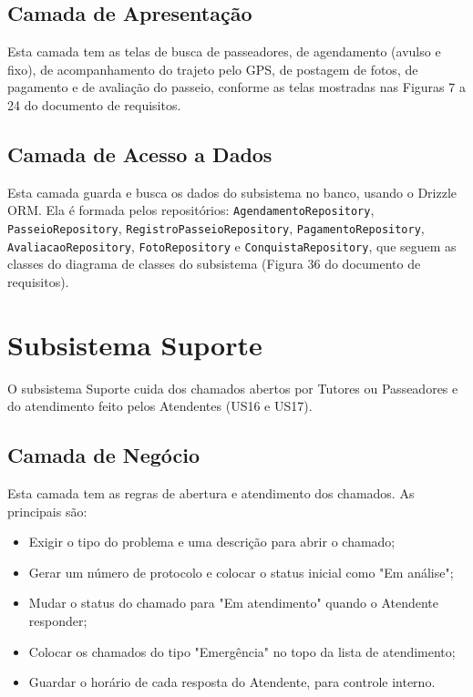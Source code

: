 \subsection{Camada de Apresentação}
\label{sec-componentes-servicos-apresentacao}

Esta camada tem as telas de busca de passeadores, de agendamento (avulso e fixo), de acompanhamento do trajeto pelo GPS, de postagem de fotos, de pagamento e de avaliação do passeio, conforme as telas mostradas nas Figuras 7 a 24 do documento de requisitos.


\subsection{Camada de Acesso a Dados}
\label{sec-componentes-servicos-dados}

Esta camada guarda e busca os dados do subsistema no banco, usando o Drizzle ORM. Ela é formada pelos repositórios: \texttt{AgendamentoRepository}, \texttt{PasseioRepository}, \texttt{RegistroPasseioRepository}, \texttt{PagamentoRepository}, \texttt{AvaliacaoRepository}, \texttt{FotoRepository} e \texttt{ConquistaRepository}, que seguem as classes do diagrama de classes do subsistema (Figura 36 do documento de requisitos).



\section{Subsistema Suporte}
\label{sec-componentes-suporte}

O subsistema Suporte cuida dos chamados abertos por Tutores ou Passeadores e do atendimento feito pelos Atendentes (US16 e US17).


\subsection{Camada de Negócio}
\label{sec-componentes-suporte-negocio}

Esta camada tem as regras de abertura e atendimento dos chamados. As principais são:

\begin{itemize}
	\item Exigir o tipo do problema e uma descrição para abrir o chamado;
	\item Gerar um número de protocolo e colocar o status inicial como "Em análise";
	\item Mudar o status do chamado para "Em atendimento" quando o Atendente responder;
	\item Colocar os chamados do tipo "Emergência" no topo da lista de atendimento;
	\item Guardar o horário de cada resposta do Atendente, para controle interno.
\end{itemize}


